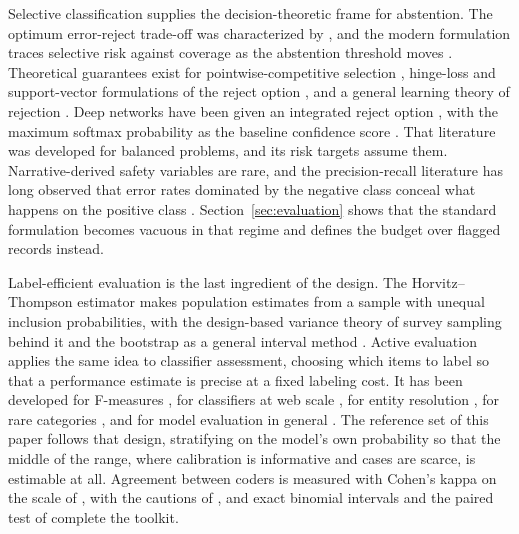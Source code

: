 Selective classification supplies the decision-theoretic frame for abstention. The optimum
error-reject trade-off was characterized by \citet{chow1970on}, and the modern formulation
traces selective risk against coverage as the abstention threshold moves
\citep{elyaniv2010foundations,geifman2017selective}. Theoretical guarantees exist for
pointwise-competitive selection \citep{wiener2015agnostic}, hinge-loss and support-vector
formulations of the reject option \citep{bartlett2008reject,wegkamp2011support}, and a
general learning theory of rejection \citep{cortes2016rejection}. Deep networks have been
given an integrated reject option \citep{geifman2019selectivenet}, with the maximum softmax
probability as the baseline confidence score \citep{hendrycks2017baseline}. That literature
was developed for balanced problems, and its risk targets assume them. Narrative-derived safety variables are rare, and the precision-recall literature
has long observed that error rates dominated by the negative class conceal what happens on
the positive class \citep{davis2006prroc,saito2015prplot}. Section~\ref{sec:evaluation}
shows that the standard formulation becomes vacuous in that regime and defines the budget
over flagged records instead.

Label-efficient evaluation is the last ingredient of the design. The Horvitz--Thompson
estimator
\citep{horvitz1952generalization} makes population estimates from a sample with unequal
inclusion probabilities, with the design-based variance theory of survey sampling behind it
\citep{kish1965survey,sarndal1992model} and the bootstrap as a general interval method
\citep{efron1993bootstrap}. Active evaluation applies the same idea to classifier assessment,
choosing which items to label so that a performance estimate is precise at a fixed labeling
cost. It has been developed for F-measures \citep{sawade2010fmeasure},
for classifiers at web scale \citep{bennett2010stratified,katariya2012active}, for entity
resolution \citep{marchant2017oasis}, for rare categories \citep{poms2021lowshot}, and for
model evaluation in general \citep{kossen2021activetesting}. The reference set of this paper
follows that design, stratifying on the model's own probability so that the middle of the
range, where calibration is informative and cases are scarce, is estimable at all. Agreement
between coders is measured with Cohen's kappa \citep{cohen1960coefficient} on the scale of
\citet{landis1977measurement}, with the cautions of \citet{mchugh2012kappa}, and exact
binomial intervals \citep{clopper1934use} and the paired test of \citet{mcnemar1947note}
complete the toolkit.

